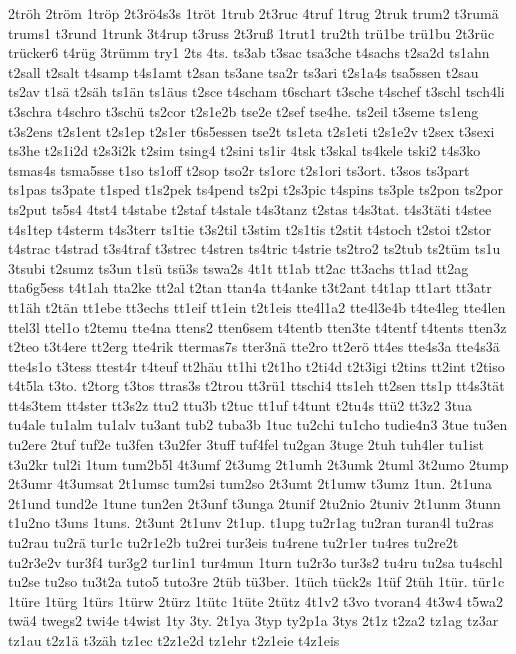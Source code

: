 {2tröh
2tröm
1tröp
2t3rö4s3s
1tröt
1trub
2t3ruc
4truf
1trug
2truk
trum2
t3rumä
trums1
t3rund
1trunk
3t4rup
t3russ
2t3ruß
1trut1
tru2th
trü1be
trü1bu
2t3rüc
trücker6
t4rüg
3trümm
try1
2ts
4ts.
ts3ab
t3sac
tsa3che
t4sachs
t2sa2d
ts1ahn
t2sall
t2salt
t4samp
t4s1amt
t2san
ts3ane
tsa2r
ts3ari
t2s1a4s
tsa5ssen
t2sau
ts2av
t1sä
t2säh
ts1än
ts1äus
t2sce
t4scham
t6schart
t3sche
t4schef
t3schl
tsch4li
t3schra
t4schro
t3schü
ts2cor
t2s1e2b
tse2e
t2sef
tse4he.
ts2eil
t3seme
ts1eng
t3s2ens
t2s1ent
t2s1ep
t2s1er
t6s5essen
tse2t
ts1eta
t2s1eti
t2s1e2v
t2sex
t3sexi
ts3he
t2s1i2d
t2s3i2k
t2sim
tsing4
t2sini
ts1ir
4tsk
t3skal
ts4kele
tski2
t4s3ko
tsmas4s
tsma5sse
t1so
ts1off
t2sop
tso2r
ts1orc
t2s1ori
ts3ort.
t3sos
ts3part
ts1pas
ts3pate
t1sped
t1s2pek
ts4pend
ts2pi
t2s3pic
t4spins
ts3ple
ts2pon
ts2por
ts2put
ts5s4
4tst4
t4stabe
t2staf
t4stale
t4s3tanz
t2stas
t4s3tat.
t4s3täti
t4stee
t4s1tep
t4sterm
t4s3terr
ts1tie
t3s2til
t3stim
t2s1tis
t2stit
t4stoch
t2stoi
t2stor
t4strac
t4strad
t3s4traf
t3strec
t4stren
ts4tric
t4strie
ts2tro2
ts2tub
ts2tüm
ts1u
3tsubi
t2sumz
ts3un
t1sü
tsü3s
tswa2s
4t1t
tt1ab
tt2ac
tt3achs
tt1ad
tt2ag
tta6g5ess
t4t1ah
tta2ke
tt2al
t2tan
ttan4a
tt4anke
t3t2ant
t4t1ap
tt1art
tt3atr
tt1äh
t2tän
tt1ebe
tt3echs
tt1eif
tt1ein
t2t1eis
tte4l1a2
tte4l3e4b
t4te4leg
tte4len
ttel3l
ttel1o
t2temu
tte4na
ttens2
tten6sem
t4tentb
tten3te
t4tentf
t4tents
tten3z
t2teo
t3t4ere
tt2erg
tte4rik
ttermas7s
tter3nä
tte2ro
tt2erö
tt4es
tte4s3a
tte4s3ä
tte4s1o
t3tess
ttest4r
t4teuf
tt2häu
tt1hi
t2t1ho
t2ti4d
t2t3igi
t2tins
tt2int
t2tiso
t4t5la
t3to.
t2torg
t3tos
ttras3s
t2trou
tt3rü1
ttschi4
tts1eh
tt2sen
tts1p
tt4s3tät
tt4s3tem
tt4ster
tt3s2z
ttu2
ttu3b
t2tuc
tt1uf
t4tunt
t2tu4s
ttü2
tt3z2
3tua
tu4ale
tu1alm
tu1alv
tu3ant
tub2
tuba3b
1tuc
tu2chi
tu1cho
tudie4n3
3tue
tu3en
tu2ere
2tuf
tuf2e
tu3fen
t3u2fer
3tuff
tuf4fel
tu2gan
3tuge
2tuh
tuh4ler
tu1ist
t3u2kr
tul2i
1tum
tum2b5l
4t3umf
2t3umg
2t1umh
2t3umk
2tuml
3t2umo
2tump
2t3umr
4t3umsat
2t1umsc
tum2si
tum2so
2t3umt
2t1umw
t3umz
1tun.
2t1una
2t1und
tund2e
1tune
tun2en
2t3unf
t3unga
2tunif
2tu2nio
2tuniv
2t1unm
3tunn
t1u2no
t3uns
1tuns.
2t3unt
2t1unv
2t1up.
t1upg
tu2r1ag
tu2ran
turan4l
tu2ras
tu2rau
tu2rä
tur1c
tu2r1e2b
tu2rei
tur3eis
tu4rene
tu2r1er
tu4res
tu2re2t
tu2r3e2v
tur3f4
tur3g2
tur1in1
tur4mun
1turn
tu2r3o
tur3s2
tu4ru
tu2sa
tu4schl
tu2se
tu2so
tu3t2a
tuto5
tuto3re
2tüb
tü3ber.
1tüch
tück2s
1tüf
2tüh
1tür.
tür1c
1türe
1türg
1türs
1türw
2türz
1tütc
1tüte
2tütz
4t1v2
t3vo
tvoran4
4t3w4
t5wa2
twä4
twegs2
twi4e
t4wist
1ty
3ty.
2t1ya
3typ
ty2p1a
3tys
2t1z
t2za2
tz1ag
tz3ar
tz1au
t2z1ä
t3zäh
tz1ec
t2z1e2d
tz1ehr
t2z1eie
t4z1eis
}
